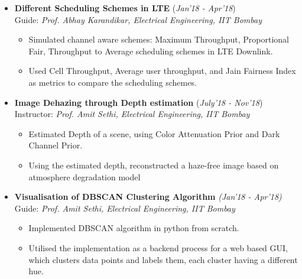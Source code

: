 \documentclass[10pt]{article}
\begin{document}
\colorbox{bl}{}
\vspace{-0.5cm}
\begin{itemize}[leftmargin=0.4cm]

\item \textbf{Different Scheduling Schemes in LTE}
\hfill{(\textit{Jan'18 - Apr'18})}\\
Guide: \textit{Prof. Abhay Karandikar, Electrical Engineering, IIT Bombay}\\
\vspace{-0.7cm}
	\begin{itemize}
	\item Simulated channel aware schemes: Maximum Throughput, Proportional Fair, Throughput to Average scheduling schemes in LTE Downlink.\vspace{-0.1cm}
	\item Used Cell Throughput, Average user throughput, and Jain Fairness Index as metrics to compare the scheduling schemes.
    \end{itemize}

	\vspace{-0.2cm}

	
\item \textbf{Image Dehazing through Depth estimation}
\hfill{(\textit{July'18 - Nov'18})}\\
Instructor: \textit{Prof. Amit Sethi, Electrical Engineering, IIT Bombay}\\\vspace{-0.68cm}	
\begin{itemize}
		\item Estimated Depth of a scene, using Color Attenuation Prior and Dark Channel Prior.\vspace{-0.1cm}
		\item Using the estimated depth, reconstructed a haze-free image based on atmosphere degradation model
    \end{itemize}	
    \vspace{-0.2cm}

\item \textbf{Visualisation of DBSCAN Clustering Algorithm}
\hfill{\textit{(Jan'18 - Apr'18)}}\\ 
Guide: \textit{Prof. Amit Sethi, Electrical Engineering, IIT Bombay}\\\vspace{-0.68cm}
    \begin{itemize}
    \item Implemented DBSCAN algorithm in python from scratch.\vspace{-0.1cm}
    \item Utilised the implementation as a backend process for a web based GUI, which clusters data points and labels them, each cluster having a different hue.
    \end{itemize}
    \vspace{-0.2cm}
    

\end{itemize}
\end{document}
